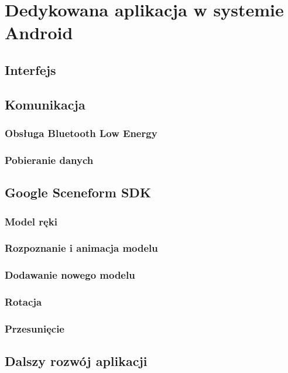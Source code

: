 \chapter{Dedykowana aplikacja w systemie Android}
\label{ch:aplikacja}

\section{Interfejs}
\label{sec:interface}


\section{Komunikacja}
\label{sec:komunikacja}

	\subsection{Obsługa Bluetooth Low Energy}
	\label{subsec:ble}
	
	
	\subsection{Pobieranie danych}
	\label{subsec:dane}
	


\section{Google Sceneform SDK}
\label{sec:sceneform}
	
	\subsection{Model ręki}
	\label{subsec:model}
	
	
	
	\subsection{Rozpoznanie i animacja modelu}
	\label{subsec:rozpoznanie}
	
	
	
	\subsection{Dodawanie nowego modelu}
	\label{subsec:nowyModel}
	
	
	
	\subsection{Rotacja}
	\label{subsec:rotacja}
	
	
	
	\subsection{Przesunięcie}
	\label{subsec:przesuniecie}	
	
	

\section{Dalszy rozwój aplikacji}
\label{sec:rozwojApp}

